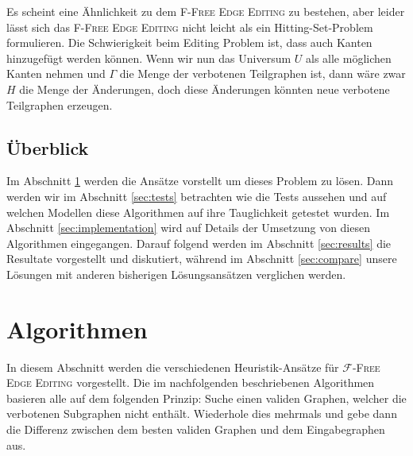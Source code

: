 \documentclass[12pt,a4paper,onecolumn,oneside,titlepage]{article}
\newcommand\cursive[1]{\ensuremath{\mathcal{#1}}}
\begin{document}
Es scheint eine Ähnlichkeit zu dem \textsc{F-Free Edge Editing} zu bestehen, aber leider lässt sich das \textsc{F-Free Edge Editing} nicht leicht als ein Hitting-Set-Problem formulieren. Die Schwierigkeit beim Editing Problem ist, dass auch Kanten hinzugefügt werden können. Wenn wir nun das Universum $U$ als alle möglichen Kanten nehmen und $\Gamma$ die Menge der verbotenen Teilgraphen ist, dann wäre zwar $H$ die Menge der Änderungen, doch diese Änderungen könnten neue verbotene Teilgraphen erzeugen.



\subsection{Überblick}
Im Abschnitt \ref{sec:algos} werden die Ansätze vorstellt um dieses Problem zu lösen. Dann werden wir im Abschnitt \ref{sec:tests} betrachten wie die Tests aussehen und auf welchen Modellen diese Algorithmen auf ihre Tauglichkeit getestet wurden. Im Abschnitt \ref{sec:implementation} wird auf Details der Umsetzung von diesen Algorithmen eingegangen. Darauf folgend werden im Abschnitt \ref{sec:results} die Resultate vorgestellt und diskutiert, während im Abschnitt \ref{sec:compare} unsere Lösungen mit anderen bisherigen Lösungsansätzen verglichen werden.

\section{Algorithmen}

\label{sec:algos}

In diesem Abschnitt werden die verschiedenen Heuristik-Ansätze für \textsc{\cursive{F}-Free Edge Editing} vorgestellt.
Die im nachfolgenden beschriebenen Algorithmen basieren alle auf dem folgenden Prinzip: Suche einen validen Graphen, welcher die verbotenen Subgraphen nicht enthält. Wiederhole dies mehrmals und gebe dann die Differenz zwischen dem besten validen Graphen und dem Eingabegraphen aus.
\end{document}
